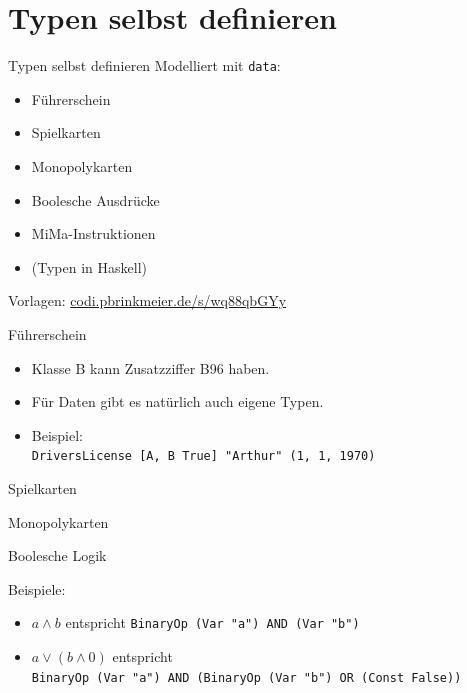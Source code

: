\documentclass{beamer}
\begin{document}
\section{Typen selbst definieren}

\begin{frame}{Typen selbst definieren}
  Modelliert mit \texttt{data}:

  \vfill

  \begin{itemize}
    \item Führerschein
    \item Spielkarten
    \item Monopolykarten
    \item Boolesche Ausdrücke
    \item MiMa-Instruktionen
    \item (Typen in Haskell)
  \end{itemize}

  \vfill

  Vorlagen: \href{https://codi.pbrinkmeier.de/s/wq88qbGYy}{codi.pbrinkmeier.de/s/wq88qbGYy}
\end{frame}

\begin{frame}{Führerschein}

  \vfill

  \begin{itemize}
    \item Klasse B kann Zusatzziffer B96 haben.
    \item Für Daten gibt es natürlich auch eigene Typen.
    \item Beispiel:\\
          \texttt{DriversLicense [A, B True] "{}Arthur"{} (1, 1, 1970)}
  \end{itemize}
\end{frame}

\begin{frame}{Spielkarten}
\end{frame}

\begin{frame}{Monopolykarten}
\end{frame}

\begin{frame}{Boolesche Logik}

  \vfill

  Beispiele:
  \begin{itemize}
    \item $a \wedge b$ entspricht \texttt{BinaryOp (Var "{}a"{}) AND (Var "{}b"{})}
    \item $a \vee (b \wedge 0)$ entspricht\\
          \texttt{BinaryOp (Var "{}a"{}) AND (BinaryOp (Var "{}b"{}) OR (Const False))}
  \end{itemize}
\end{frame}
\end{document}
